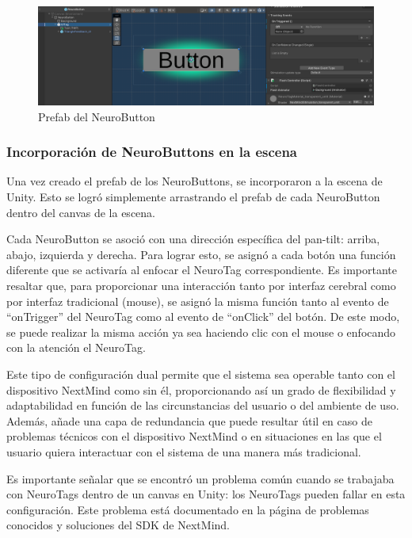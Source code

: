 \begin{figure}[!htb]
\centering
\includegraphics[width=1\linewidth]{figures/prefab-neurobutton.png}
\caption{Prefab del NeuroButton}
\label{figure:prefab-neurobutton}
\end{figure}


\subsubsection{Incorporación de NeuroButtons en la escena}

Una vez creado el prefab de los NeuroButtons, se incorporaron a la escena de Unity. Esto se logró simplemente arrastrando el prefab de cada NeuroButton dentro del canvas de la escena.



Cada NeuroButton se asoció con una dirección específica del pan-tilt: arriba, abajo, izquierda y derecha. Para lograr esto, se asignó a cada botón una función diferente que se activaría al enfocar el NeuroTag correspondiente. Es importante resaltar que, para proporcionar una interacción tanto por interfaz cerebral como por interfaz tradicional (mouse), se asignó la misma función tanto al evento de ``onTrigger'' del NeuroTag como al evento de ``onClick'' del botón. De este modo, se puede realizar la misma acción ya sea haciendo clic con el mouse o enfocando con la atención el NeuroTag.



Este tipo de configuración dual permite que el sistema sea operable tanto con el dispositivo NextMind como sin él, proporcionando así un grado de flexibilidad y adaptabilidad en función de las circunstancias del usuario o del ambiente de uso. Además, añade una capa de redundancia que puede resultar útil en caso de problemas técnicos con el dispositivo NextMind o en situaciones en las que el usuario quiera interactuar con el sistema de una manera más tradicional.



Es importante señalar que se encontró un problema común cuando se trabajaba con NeuroTags dentro de un canvas en Unity: los NeuroTags pueden fallar en esta configuración. Este problema está documentado en la página de problemas conocidos y soluciones del SDK de NextMind\cite{NextMindKnownIssues}.



